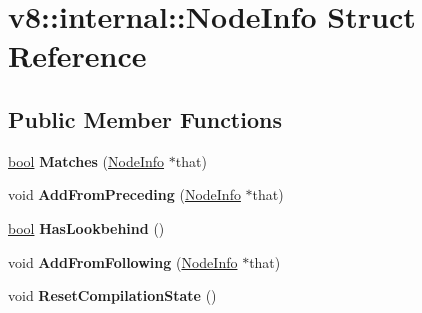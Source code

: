 \hypertarget{structv8_1_1internal_1_1NodeInfo}{}\section{v8\+:\+:internal\+:\+:Node\+Info Struct Reference}
\label{structv8_1_1internal_1_1NodeInfo}
\subsection*{Public Member Functions}
\begin{DoxyCompactItemize}
\item 
\mbox{\label{structv8_1_1internal_1_1NodeInfo_af4bd1340f0fdd6223ad65b0a9ed00ebe}} 
\mbox{\hyperlink{classbool}{bool}} {\bfseries Matches} (\mbox{\hyperlink{structv8_1_1internal_1_1NodeInfo}{Node\+Info}} $\ast$that)
\item 
\mbox{\label{structv8_1_1internal_1_1NodeInfo_ae61bab54bf13eb31bd647c6e3a361a58}} 
void {\bfseries Add\+From\+Preceding} (\mbox{\hyperlink{structv8_1_1internal_1_1NodeInfo}{Node\+Info}} $\ast$that)
\item 
\mbox{\label{structv8_1_1internal_1_1NodeInfo_a38e5726083c41a3b94f336e9c003da02}} 
\mbox{\hyperlink{classbool}{bool}} {\bfseries Has\+Lookbehind} ()
\item 
\mbox{\label{structv8_1_1internal_1_1NodeInfo_a074b23d256b33ea95eb8b33332a357b6}} 
void {\bfseries Add\+From\+Following} (\mbox{\hyperlink{structv8_1_1internal_1_1NodeInfo}{Node\+Info}} $\ast$that)
\item 
\mbox{\label{structv8_1_1internal_1_1NodeInfo_a9de3bfee1c5a9f3628a1e982ba55c1ce}} 
void {\bfseries Reset\+Compilation\+State} ()
\end{DoxyCompactItemize}
